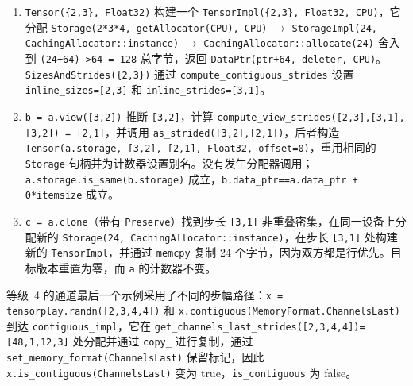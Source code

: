 \begin{enumerate}[leftmargin=1.2em]
\item \texttt{Tensor(\{2,3\}, Float32)} 构建一个 \texttt{TensorImpl(\{2,3\}, Float32, CPU)}，它分配 \texttt{Storage(2*3*4, getAllocator(CPU), CPU)} $\rightarrow$ \texttt{StorageImpl(24, CachingAllocator::instance)} $\rightarrow$ \texttt{CachingAllocator::allocate(24)} 舍入到 \texttt{(24+64)->64 = 128} 总字节，返回 \texttt{DataPtr(ptr+64, deleter, CPU)}。 \texttt{SizesAndStrides(\{2,3\})} 通过 \texttt{compute\_contiguous\_strides} 设置 \texttt{inline\_sizes=[2,3]} 和 \texttt{inline\_strides=[3,1]}。
\item \texttt{b = a.view([3,2])} 推断 \texttt{[3,2]}，计算 \texttt{compute\_view\_strides([2,3],[3,1],[3,2]) = [2,1]}，并调用 \texttt{as\_strided([3,2],[2,1])}，后者构造 \texttt{Tensor(a.storage, [3,2], [2,1], Float32, offset=0)}，重用相同的 \texttt{Storage} 句柄并为计数器设置别名。没有发生分配器调用； \texttt{a.storage.is\_same(b.storage)} 成立，\texttt{b.data\_ptr==a.data\_ptr + 0*itemsize} 成立。
\item \texttt{c = a.clone}（带有 \texttt{Preserve}）找到步长 \texttt{[3,1]} 非重叠密集，在同一设备上分配新的 \texttt{Storage(24, CachingAllocator::instance)}，在步长 \texttt{[3,1]} 处构建新的 \texttt{TensorImpl}，并通过 \texttt{memcpy} 复制 24 个字节，因为双方都是行优先。目标版本重置为零，而 \texttt{a} 的计数器不变。
\end{enumerate}

等级~4 的通道最后一个示例采用了不同的步幅路径：\texttt{x = tensorplay.randn([2,3,4,4])} 和 \texttt{x.contiguous(MemoryFormat.ChannelsLast)} 到达 \texttt{contiguous\_impl}，它在 \texttt{get\_channels\_last\_strides([2,3,4,4])=[48,1,12,3]} 处分配并通过 \texttt{copy\_} 进行复制，通过 \texttt{set\_memory\_format(ChannelsLast)} 保留标记，因此 \texttt{x.is\_contiguous(ChannelsLast)} 变为 true，\texttt{is\_contiguous} 为 false。


